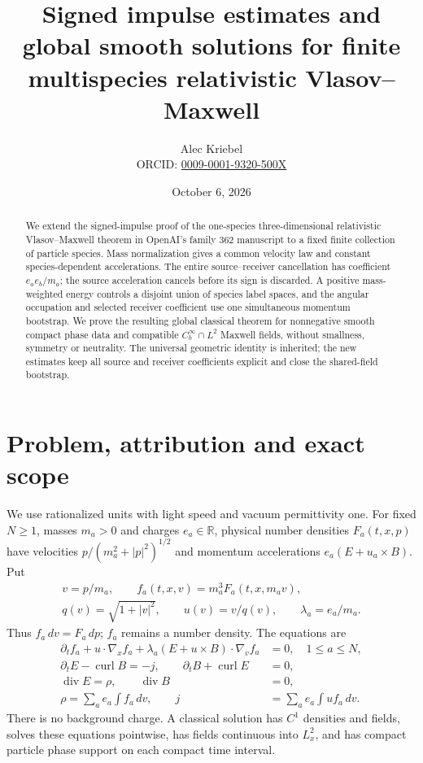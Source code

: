 \documentclass[11pt]{article}
\title{Signed impulse estimates and global smooth solutions for finite multispecies relativistic Vlasov--Maxwell}
\author{Alec Kriebel\\\small ORCID: \href{https://orcid.org/0009-0001-9320-500X}{0009-0001-9320-500X}}
\date{October 6, 2026}
\newcommand{\R}{\mathbb R}
\newcommand{\diver}{\operatorname{div}}
\newcommand{\curl}{\operatorname{curl}}
\theoremstyle{remark}\newtheorem{remark}[theorem]{Remark}
\numberwithin{equation}{section}
\begin{document}
\maketitle
\begin{abstract}
We extend the signed-impulse proof of the one-species
three-dimensional relativistic Vlasov--Maxwell theorem in OpenAI's family 362
manuscript to a fixed finite collection of particle species. Mass normalization
gives a common velocity law and constant species-dependent accelerations.
The entire source--receiver cancellation has coefficient $e_a e_b/m_a$;
the source acceleration cancels before its sign is discarded. A positive
mass-weighted energy controls a disjoint union of species label spaces,
and the angular occupation and selected receiver coefficient use one
simultaneous momentum bootstrap. We prove the resulting global
classical theorem for nonnegative smooth compact phase data and compatible
$C_b^\infty\cap L^2$ Maxwell fields, without smallness, symmetry or neutrality.
The universal geometric identity is inherited; the new estimates keep all
source and receiver coefficients explicit and close the shared-field bootstrap.
\end{abstract}

\section{Problem, attribution and exact scope}
We use rationalized units with light speed and vacuum permittivity one.
For fixed $N\ge1$, masses $m_a>0$ and charges $e_a\in\R$, physical number
densities $F_a(t,x,p)$ have velocities
$p/(m_a^2+|p|^2)^{1/2}$ and momentum accelerations
$e_a(E+u_a\times B)$. Put
\begin{equation}\label{eq:normalization}
 \begin{gathered}
 v=p/m_a,\qquad f_a(t,x,v)=m_a^3F_a(t,x,m_av),\\
 q(v)=\sqrt{1+|v|^2},\qquad u(v)=v/q(v),\qquad\lambda_a=e_a/m_a.
 \end{gathered}
\end{equation}
Thus $f_a\,dv=F_a\,dp$; $f_a$ remains a number density. The equations are
\begin{equation}\label{eq:system}
\begin{aligned}
 \partial_t f_a+u\cdot\nabla_x f_a+
      \lambda_a(E+u\times B)\cdot\nabla_v f_a&=0,\quad 1\le a\le N,\\
 \partial_t E-\curl B=-j,\qquad \partial_t B+\curl E&=0,\\
 \diver E=\rho,\qquad\diver B&=0,\\
 \rho=\sum_a e_a\int f_a\,dv,\qquad j&=\sum_a e_a\int uf_a\,dv.
\end{aligned}
\end{equation}
There is no background charge. A classical solution has $C^1$ densities and
fields, solves these equations pointwise, has fields continuous into $L^2_x$,
and has compact particle phase support on each compact time interval.
\end{document}

